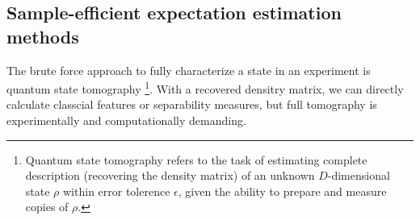 \documentclass[
aps,
pra,
twocolumn,
floatfix,
]{revtex4-2}
\theoremstyle{plain}
\theoremstyle{definition}
\newtheorem{problem}{Problem}
\newcommand{\dm}{\rho}
\begin{document}

\subsection{Sample-efficient expectation estimation methods}\label{sec:estimation}
The brute force approach to fully characterize a state in an experiment is quantum state tomography \cite{altepeterPhotonicStateTomography2005}
\footnote{Quantum state tomography refers to the task of estimating complete description (recovering the density matrix) of an unknown $D$-dimensional state $\dm$ within error tolerence $\epsilon$, 
given the ability to prepare and measure copies of $\dm$.}.
With a recovered densitry matrix, we can directly calculate classcial features or separability measures,
but full tomography is experimentally and computationally demanding.
\end{document}
